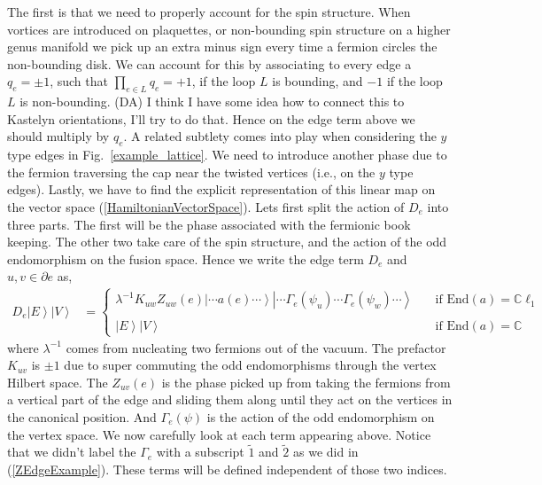 \documentclass[12pt,a4paper]{article}
\newcommand{\ket}[1]{\ensuremath{\left|#1\right\rangle}}
\newcommand{\dave}[1]{{\color{ao(english)}\footnotesize{(DA) #1}}}
\begin{document}
The first is that we need to properly account for the spin structure. 
When vortices are introduced on plaquettes, or non-bounding spin structure on a higher genus manifold we pick up an extra minus sign every time a fermion circles the non-bounding disk. 
We can account for this by associating to every edge a $q_e = \pm1$, such that $\prod_{e \in L} q_e = +1$, if the loop $L$ is bounding, and $-1$ if the loop $L$ is non-bounding.
\dave{I think I have some idea how to connect this to Kastelyn orientations, I'll try to do that.}
Hence on the edge term above we should multiply by $q_e$. 
A related subtlety comes into play when considering the $y$ type edges in Fig.~\ref{example_lattice}. 
We need to introduce another phase due to the fermion traversing the cap near the twisted vertices (i.e., on the $y$ type edges).
Lastly, we have to find the explicit representation of this linear map on the vector space (\ref{HamiltonianVectorSpace}). 
Lets first split the action of $D_e$ into three parts. 
The first will be the phase associated with the fermionic book keeping. 
The other two take care of the spin structure, and the action of the odd endomorphism on the fusion space.
Hence we write the edge term $D_e$ and $u, v \in \partial e$ as,
\begin{align}
D_e\ket{E}\ket{V} &= 
\left\{
                \begin{array}{ll}
                  \lambda^{-1} K_{uw} Z_{uw}(e) \ket{\cdots a(e)\cdots }\ket{\cdots \Gamma_e (\psi_u) \cdots \Gamma_e (\psi_w) \cdots} \quad & \text{if }\text{End}(a) = \mathbb{C} \ell_1 \\
                  \\
                  \ket{E} \ket{V} & \text{if } \text{End}(a) = \mathbb{C}
                \end{array}
              \right.
              \label{EdgeHamiltonian}
\end{align}
where $\lambda^{-1}$ comes from nucleating two fermions out of the vacuum. The prefactor $K_{uv}$ is $\pm1$ due to super commuting the odd endomorphisms through the vertex Hilbert space.
The $Z_{uv}(e)$ is the phase picked up from taking the fermions from a vertical part of the edge and sliding them along until they act on the vertices in the canonical position.
And $\Gamma_e(\psi)$ is the action of the odd endomorphism on the vertex space. 
We now carefully look at each term appearing above. 
Notice that we didn't label the $\Gamma_e$ with a subscript $\tilde{1}$ and $\tilde{2}$ as we did in (\ref{ZEdgeExample}). 
These terms will be defined independent of those two indices.
\end{document}
